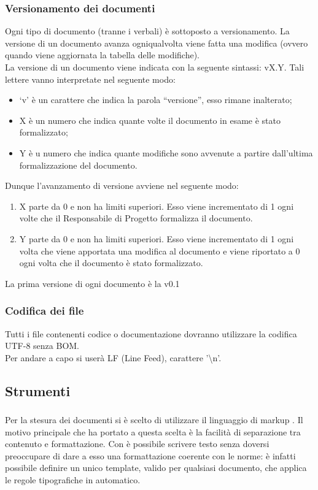 		\subsubsection{Versionamento dei documenti}
			Ogni tipo di documento (tranne i verbali) è sottoposto a versionamento. La versione di un documento avanza ogniqualvolta viene fatta una modifica (ovvero quando viene aggiornata la tabella delle modifiche).\\
			La versione di un documento viene indicata con la seguente sintassi: vX.Y. Tali lettere vanno interpretate nel seguente modo:
			\begin{itemize}
				\item ‘v’ è un carattere che indica la parola “versione”, esso rimane inalterato;
				\item X è un numero che indica quante volte il documento in esame è stato formalizzato;
				\item Y è u numero che indica quante modifiche sono avvenute a partire dall’ultima formalizzazione del documento.
			\end{itemize}
			Dunque l’avanzamento di versione avviene nel seguente modo:
			\begin{enumerate}
				\item X parte da 0 e non ha limiti superiori. Esso viene incrementato di 1 ogni volte che il Responsabile di Progetto formalizza il documento.
				\item Y parte da 0 e non ha limiti superiori. Esso viene incrementato di 1 ogni volta che viene apportata una modifica al documento e viene riportato a 0 ogni volta che il documento è stato formalizzato.
			\end{enumerate}
			La prima versione di ogni documento è la v0.1
		\subsubsection{Codifica dei file}
			Tutti i file contenenti codice o documentazione dovranno utilizzare la codifica UTF-8 senza BOM.\\
			Per andare a capo si userà LF (Line Feed), carattere '\textbackslash n'.
	\subsection{Strumenti}
		\subsubsection{\latex{}}
			Per la stesura dei documenti si è scelto di utilizzare il linguaggio di markup \latex{}.  Il motivo principale che ha portato a questa scelta è la facilità di separazione tra contenuto e formattazione. Con \latex{} è possibile scrivere testo senza doversi preoccupare di dare a esso una formattazione coerente con le norme: è infatti possibile definire un unico template, valido per qualsiasi documento, che applica le regole tipografiche in automatico.
